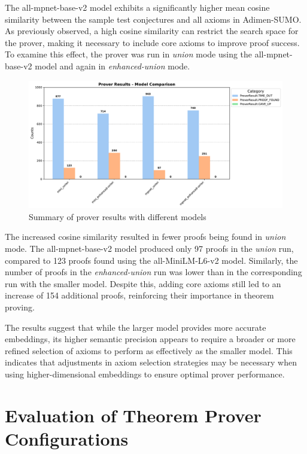 \documentclass[english,version-2020-11]{uzl-thesis}
\begin{document}
The all-mpnet-base-v2 model exhibits a significantly higher mean cosine similarity between the sample test conjectures and all axioms in Adimen-SUMO. As previously observed, a high cosine similarity can restrict the search space for the prover, making it necessary to include core axioms to improve proof success. To examine this effect, the prover was run in \textit{union} mode using the all-mpnet-base-v2 model and again in \textit{enhanced-union} mode.

\begin{figure}[h!]
    \centering
    \includegraphics[width=\textwidth]{different_mode_output.pdf}
    \caption{Summary of prover results with different models}
    \label{fig:results_different_models}
\end{figure}        
\FloatBarrier

The increased cosine similarity resulted in fewer proofs being found in \textit{union} mode. The all-mpnet-base-v2 model produced only 97 proofs in the \textit{union} run, compared to 123 proofs found using the all-MiniLM-L6-v2 model. Similarly, the number of proofs in the \textit{enhanced-union} run was lower than in the corresponding run with the smaller model. Despite this, adding core axioms still led to an increase of 154 additional proofs, reinforcing their importance in theorem proving.

The results suggest that while the larger model provides more accurate embeddings, its higher semantic precision appears to require a broader or more refined selection of axioms to perform as effectively as the smaller model. This indicates that adjustments in axiom selection strategies may be necessary when using higher-dimensional embeddings to ensure optimal prover performance.


\section{Evaluation of Theorem Prover Configurations}
\end{document}
